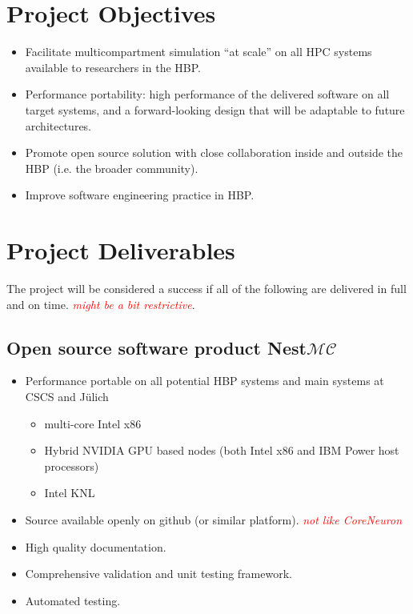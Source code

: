 \documentclass[11pt,a4paper]{article}
\newcommand{\hilight}[1]{\textit{\textcolor{Red}{#1}}}
\newcommand{\julich}[0]{J\"ulich\xspace}
\newcommand{\nestmc}[0]{Nest$\mathcal{MC}$\xspace}
\begin{document}
\section{Project Objectives}

\begin{itemize}
    \item Facilitate multicompartment simulation ``at scale'' on all HPC systems available to researchers in the HBP.
    \item Performance portability: high performance of the delivered software on all target systems, and a forward-looking design that will be adaptable to future architectures.
    \item Promote open source solution with close collaboration inside and outside the HBP (i.e. the broader community).
    \item Improve software engineering practice in HBP.
\end{itemize}

\section{Project Deliverables}
The project will be considered a success if all of the following are delivered in full and on time.
\hilight{might be a bit restrictive}.

\subsection{Open source software product \nestmc}

\begin{itemize}
    \item   Performance portable on all potential HBP systems and main systems at CSCS and \julich
    \begin{itemize}
        \item   multi-core Intel x86
        \item   Hybrid NVIDIA GPU based nodes (both Intel x86 and IBM Power host processors)
        \item   Intel KNL
    \end{itemize}
    \item   Source available openly on github (or similar platform). \hilight{not like CoreNeuron}
    \item   High quality documentation.
    \item   Comprehensive validation and unit testing framework.
    \item   Automated testing.
\end{itemize}
\end{document}
